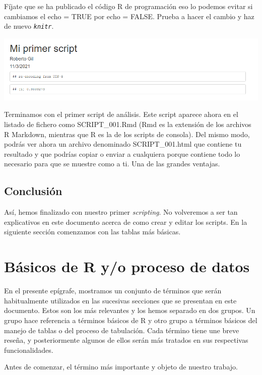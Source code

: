 \documentclass[
]{book}
\begin{document}
Fíjate que se ha publicado el código R de programación eso lo podemos evitar si cambiamos el echo = TRUE por echo = FALSE. Prueba a hacer el cambio y haz de nuevo \emph{\texttt{knitr}}.

\includegraphics{data/RS13.png}

Terminamos con el primer script de análisis. Este script aparece ahora en el listado de fichero como SCRIPT\_001.Rmd (Rmd es la extensión de los archivos R Markdown, mientras que R es la de los scripts de consola). Del mismo modo, podrás ver ahora un archivo denominado SCRIPT\_001.html que contiene tu resultado y que podrías copiar o enviar a cualquiera porque contiene todo lo necesario para que se muestre como a ti. Una de las grandes ventajas.

\hypertarget{conclusiuxf3n}{%
\subsection{Conclusión}\label{conclusiuxf3n}}

Así, hemos finalizado con nuestro primer \emph{scripting}. No volveremos a ser tan explicativos en este documento acerca de como crear y editar los scripts. En la siguiente sección comenzamos con las tablas más básicas.

\hypertarget{buxe1sicos-de-r-yo-proceso-de-datos}{%
\section{Básicos de R y/o proceso de datos}\label{buxe1sicos-de-r-yo-proceso-de-datos}}

En el presente epígrafe, mostramos un conjunto de términos que serán habitualmente utilizados en las sucesivas secciones que se presentan en este documento. Estos son los más relevantes y los hemos separado en dos grupos. Un grupo hace referencia a términos básicos de R y otro grupo a términos básicos del manejo de tablas o del proceso de tabulación. Cada término tiene une breve reseña, y posteriormente algunos de ellos serán más tratados en sus respectivas funcionalidades.

Antes de comenzar, el término más importante y objeto de nuestro trabajo.
\end{document}
